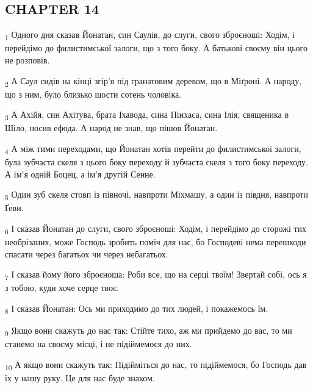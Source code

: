 \subsection{CHAPTER 14}
\begin{tcolorbox}
\textsubscript{1} Одного дня сказав Йонатан, син Саулів, до слуги, свого зброєноші: Ходім, і перейдімо до филистимської залоги, що з того боку. А батькові своєму він цього не розповів.
\end{tcolorbox}
\begin{tcolorbox}
\textsubscript{2} А Саул сидів на кінці згір'я під гранатовим деревом, що в Міґроні. А народу, що з ним, було близько шости сотень чоловіка.
\end{tcolorbox}
\begin{tcolorbox}
\textsubscript{3} А Ахійя, син Ахітува, брата Іхавода, сина Пінхаса, сина Ілія, священика в Шіло, носив ефода. А народ не знав, що пішов Йонатан.
\end{tcolorbox}
\begin{tcolorbox}
\textsubscript{4} А між тими переходами, що Йонатан хотів перейти до филистимської залоги, була зубчаста скеля з цього боку переходу й зубчаста скеля з того боку переходу. А ім'я одній Боцец, а ім'я другій Сенне.
\end{tcolorbox}
\begin{tcolorbox}
\textsubscript{5} Один зуб скеля стовп із півночі, навпроти Міхмашу, а один із півдня, навпроти Ґеви.
\end{tcolorbox}
\begin{tcolorbox}
\textsubscript{6} І сказав Йонатан до слуги, свого зброєноші: Ходім, і перейдімо до сторожі тих необрізаних, може Господь зробить поміч для нас, бо Господеві нема перешкоди спасати через багатьох чи через небагатьох.
\end{tcolorbox}
\begin{tcolorbox}
\textsubscript{7} І сказав йому його зброєноша: Роби все, що на серці твоїм! Звертай собі, ось я з тобою, куди хоче серце твоє.
\end{tcolorbox}
\begin{tcolorbox}
\textsubscript{8} І сказав Йонатан: Ось ми приходимо до тих людей, і покажемось їм.
\end{tcolorbox}
\begin{tcolorbox}
\textsubscript{9} Якщо вони скажуть до нас так: Стійте тихо, аж ми прийдемо до вас, то ми станемо на своєму місці, і не підіймемося до них.
\end{tcolorbox}
\begin{tcolorbox}
\textsubscript{10} А якщо вони скажуть так: Підійміться до нас, то підіймемося, бо Господь дав їх у нашу руку. Це для нас буде знаком.
\end{tcolorbox}
